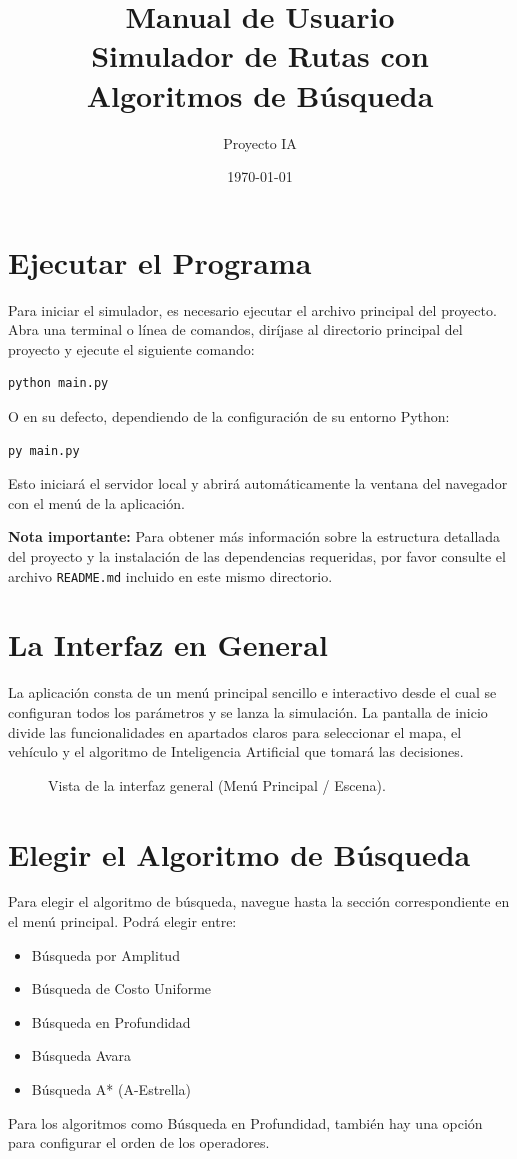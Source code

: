 \documentclass[12pt]{article}
\title{Manual de Usuario\\ \large Simulador de Rutas con Algoritmos de Búsqueda}
\author{Proyecto IA}
\date{\today}
\begin{document}
\maketitle
\tableofcontents
\newpage

\section{Ejecutar el Programa}
Para iniciar el simulador, es necesario ejecutar el archivo principal del proyecto. Abra una terminal o línea de comandos, diríjase al directorio principal del proyecto y ejecute el siguiente comando:
\begin{verbatim}
python main.py
\end{verbatim}
O en su defecto, dependiendo de la configuración de su entorno Python:
\begin{verbatim}
py main.py
\end{verbatim}
Esto iniciará el servidor local y abrirá automáticamente la ventana del navegador con el menú de la aplicación.

\vspace{0.5cm}
\noindent\textbf{Nota importante:} Para obtener más información sobre la estructura detallada del proyecto y la instalación de las dependencias requeridas, por favor consulte el archivo \texttt{README.md} incluido en este mismo directorio.

\section{La Interfaz en General}
La aplicación consta de un menú principal sencillo e interactivo desde el cual se configuran todos los parámetros y se lanza la simulación. La pantalla de inicio divide las funcionalidades en apartados claros para seleccionar el mapa, el vehículo y el algoritmo de Inteligencia Artificial que tomará las decisiones.

\begin{figure}[h!]
    \centering
    \vspace{6cm} %
    \caption{Vista de la interfaz general (Menú Principal / Escena).}
\end{figure}

\section{Elegir el Algoritmo de Búsqueda}
Para elegir el algoritmo de búsqueda, navegue hasta la sección correspondiente en el menú principal. Podrá elegir entre:
\begin{itemize}
    \item Búsqueda por Amplitud
    \item Búsqueda de Costo Uniforme
    \item Búsqueda en Profundidad
    \item Búsqueda Avara
    \item Búsqueda A* (A-Estrella)
\end{itemize}
Para los algoritmos como Búsqueda en Profundidad, también hay una opción para configurar el orden de los operadores.
\end{document}

